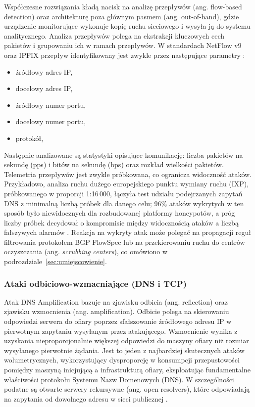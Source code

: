 \documentclass[a4paper,12pt]{article}
\begin{document}
Współczesne rozwiązania kładą nacisk na analizę przepływów (ang. flow-based detection) oraz architekturę poza głównym pasmem (ang. out-of-band), gdzie urządzenie monitorujące wykonuje kopię ruchu sieciowego i wysyła ją do systemu analitycznego. Analiza przepływów polega na ekstrakcji kluczowych cech pakietów i grupowaniu ich w ramach przepływów. W standardach NetFlow v9 \cite{rfc3954} oraz IPFIX \cite{rfc7011} przepływ identyfikowany jest zwykle przez następujące parametry \label{Netflow}:
\begin{itemize}
    \item źródłowy adres IP,
    \item docelowy adres IP,
    \item źródłowy numer portu,
    \item docelowy numer portu,
    \item protokół,
\end{itemize}
Następnie analizowane są statystyki opisujące komunikację: liczba pakietów na sekundę (pps) i bitów na sekundę (bps) oraz rozkład wielkości pakietów. Telemetria przepływów jest zwykle próbkowana, co ogranicza widoczność ataków. Przykładowo, analiza ruchu dużego europejskiego punktu wymiany ruchu (IXP), próbkowanego w proporcji 1:16\,000, łączyła test udziału podejrzanych zapytań DNS z minimalną liczbą próbek dla danego celu; 96\% ataków wykrytych w ten sposób było niewidocznych dla rozbudowanej platformy honeypotów, a próg liczby próbek decydował o kompromisie między widocznością ataków a liczbą fałszywych alarmów \cite{nawrocki2021far}. Reakcja na wykryty atak może polegać na propagacji reguł filtrowania protokołem BGP FlowSpec \cite{rfc8955} lub na przekierowaniu ruchu do centrów oczyszczania (ang. \textit{scrubbing centers}), co omówiono w podrozdziale~\ref{sec:umiejscowienie}.
\subsubsection{Ataki odbiciowo-wzmacniające (DNS i TCP)}
Atak DNS Amplification bazuje na zjawisku odbicia (ang. reflection) oraz zjawisku wzmocnienia (ang. amplification). Odbicie polega na skierowaniu odpowiedzi serwera do ofiary poprzez sfałszowanie źródłowego adresu IP w pierwotnym zapytaniu wysyłanym przez atakującego. Wzmocnienie wynika z uzyskania nieproporcjonalnie większej odpowiedzi do maszyny ofiary niż rozmiar wysyłanego pierwotnie żądania. Jest to jeden z najbardziej skutecznych ataków wolumetrycznych, wykorzystujący dysproporcję w konsumpcji przepustowości pomiędzy maszyną inicjującą a infrastrukturą ofiary, eksploatując fundamentalne właściwości protokołu Systemu Nazw Domenowych (DNS). W szczególności podatne są otwarte serwery rekursywne (ang. open resolvers), które odpowiadają na zapytania od dowolnego adresu w sieci publicznej \cite{rfc5358}.
\end{document}

